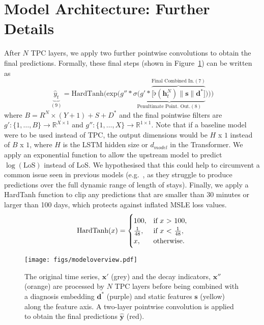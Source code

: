 \documentclass[sigconf]{acmart}
\begin{document}
\appendix

\section{Model Architecture: Further Details}
\label{sec:fullmodel}
After $N$ TPC layers, we apply two further pointwise convolutions to obtain the final predictions. Formally, these final steps (shown in Figure~\ref{fig:modeloverview}) can be written as
\begin{equation}
    \underbrace{\hat{y}_t}_{(9)} = \text{HardTanh}\bigg(\text{exp}\Big(g'' \ast \underbrace{\sigma\Big(g' \ast \overbrace{\Big[\flat(\mathbf{h}_t^{N}) \parallel \mathbf{s} \parallel \mathbf{d^*}\Big]}^{\text{Final Combined In.}(7)}}_{\text{Penultimate Point.\ Out.}(8)}\Big)\Big)\bigg)
\end{equation}
where $B=R^{N}\times(Y+1) + S + D^*$ and the final pointwise filters are $g':\{1,\ldots,B\}\to\mathbb{R}^{X\times 1}$ and $g'':\{1,\ldots,X\}\to\mathbb{R}^{1\times 1}$. Note that if a baseline model were to be used instead of TPC, the output dimensions would be $H$ x $1$ instead of $B$ x $1$, where $H$ is the LSTM hidden size or $d_{model}$ in the Transformer. We apply an exponential function to allow the upstream model to predict $\log(\text{LoS})$ instead of LoS. We hypothesised that this could help to circumvent a common issue seen in previous models (e.g.\ \citet{harutyunyan}, as they struggle to produce predictions over the full dynamic range of length of stays). Finally, we apply a HardTanh function \citep{DBLP:journals/corr/GulcehreMDB16} to clip any predictions that are smaller than 30 minutes or larger than 100 days, which protects against inflated MSLE loss values.
\begin{equation}
        \text{HardTanh}(x) =
        \begin{cases}
            100,          & \text{if } x~\text{\textgreater}~100,\\
            \frac{1}{48},          & \text{if } x~\text{\textless}~\frac{1}{48},\\
            x,         & \text{otherwise.}
        \end{cases}
\end{equation}

\begin{figure}
\centering
\hspace{5em}\texttt{[image: figs/modeloverview.pdf]}
\caption{The original time series, $\mathbf{x'}$ (grey) and the decay indicators, $\mathbf{x''}$ (orange) are processed by $N$ TPC layers before being combined with a diagnosis embedding $\mathbf{d^*}$ (purple) and static features $\mathbf{s}$ (yellow) along the feature axis. A two-layer pointwise convolution is applied to obtain the final predictions $\mathbf{\hat{y}}$ (red).}
\label{fig:modeloverview}
\end{figure}
\end{document}
